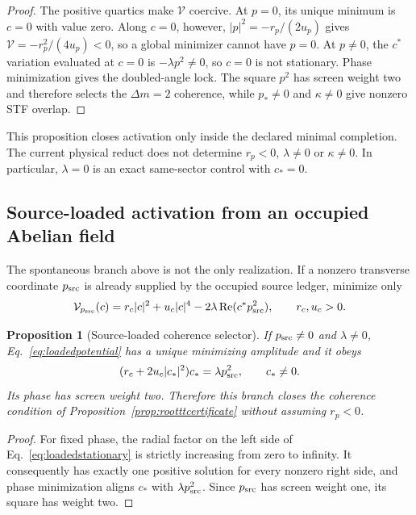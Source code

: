 \documentclass[11pt]{article}
\newtheorem{proposition}{Proposition}
\begin{document}
\begin{proof}
The positive quartics make $\mathcal V$ coercive.  At $p=0$, its unique
minimum is $c=0$ with value zero.  Along $c=0$, however,
$|p|^2=-r_p/(2u_p)$ gives $\mathcal V=-r_p^2/(4u_p)<0$, so a global minimizer
cannot have $p=0$.  At $p\neq0$, the $c^*$ variation evaluated at $c=0$ is
$-\lambda p^2\neq0$, so $c=0$ is not stationary.  Phase minimization gives
the doubled-angle lock.  The square $p^2$ has screen weight two and therefore
selects the $\Delta m=2$ coherence, while $p_*\neq0$ and $\kappa\neq0$ give
nonzero STF overlap.
\end{proof}

This proposition closes activation only inside the declared minimal
completion.  The current physical reduct does not determine $r_p<0$,
$\lambda\neq0$ or $\kappa\neq0$.  In particular, $\lambda=0$ is an exact
same-sector control with $c_*=0$.

\subsection{Source-loaded activation from an occupied Abelian field}

The spontaneous branch above is not the only realization.  If a nonzero
transverse coordinate $p_{\rm src}$ is already supplied by the occupied
source ledger, minimize only
\begin{equation}
\mathcal V_{p_{\rm src}}(c)=r_c|c|^2+u_c|c|^4
-2\lambda\operatorname{Re}(c^*p_{\rm src}^2),
\qquad r_c,u_c>0.
\label{eq:loadedpotential}
\end{equation}

\begin{proposition}[Source-loaded coherence selector]
If $p_{\rm src}\neq0$ and $\lambda\neq0$, Eq.~\eqref{eq:loadedpotential}
has a unique minimizing amplitude and it obeys
\begin{equation}
(r_c+2u_c|c_*|^2)c_*=\lambda p_{\rm src}^2,
\qquad c_*\neq0.
\label{eq:loadedstationary}
\end{equation}
Its phase has screen weight two.  Therefore this branch closes the coherence
condition of Proposition~\ref{prop:rootttcertificate} without assuming
$r_p<0$.
\end{proposition}

\begin{proof}
For fixed phase, the radial factor on the left side of
Eq.~\eqref{eq:loadedstationary} is strictly increasing from zero to infinity.
It consequently has exactly one positive solution for every nonzero right
side, and phase minimization aligns $c_*$ with
$\lambda p_{\rm src}^2$.  Since $p_{\rm src}$ has screen weight one, its
square has weight two.
\end{proof}
\end{document}
